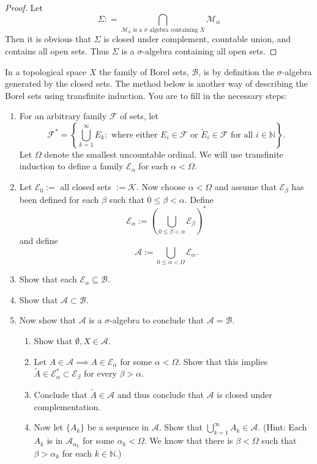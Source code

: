 \documentclass[../main.tex]{subfiles}
\begin{document}
\begin{proof}
    Let \[
     \Sigma : = \bigcap_{\mathcal{M}_{\alpha } \text{ is a } \sigma \text{ algebra containing }X }\mathcal{M}_{\alpha } 
    \] Then it is obvious that \(   \Sigma   \) is closed under complement,  countable union, and contains all open sets. Thus \(   \Sigma   \) is a \(   \sigma   \)-algebra containing all open sets.   
\end{proof}

\begin{exercise}{}{}
     In a topological space $X$ the family of Borel sets, $\mathcal{B}$, is by definition the $\sigma$-algebra generated by the closed sets. The method below is another way of describing the Borel sets using transfinite induction. You are to fill in the necessary steps:
    \begin{enumerate}
        \item For an arbitrary family $\mathcal{F}$ of sets, let
        \[
            \mathcal{F}^* = \left\{ \bigcup_{k=1}^{\infty} E_k : \text{ where either } E_i \in \mathcal{F} \text{ or } \tilde{E}_i \in \mathcal{F} \text{ for all } i \in \mathbb{N} \right\}.
        \]
        Let $\Omega$ denote the smallest uncountable ordinal. We will use transfinite induction to define a family $\mathcal{E}_\alpha$ for each $\alpha < \Omega$.
        \item Let $\mathcal{E}_0 :=$ all closed sets $:= \mathcal{K}$. Now choose $\alpha < \Omega$ and assume that $\mathcal{E}_\beta$ has been defined for each $\beta$ such that $0 \le \beta < \alpha$. Define
        \[
            \mathcal{E}_\alpha := \left( \bigcup_{0 \le \beta < \alpha} \mathcal{E}_\beta \right)^*
        \]
        and define
        \[
            \mathcal{A} := \bigcup_{0 \le \alpha < \Omega} \mathcal{E}_\alpha.
        \]
        \item Show that each $\mathcal{E}_\alpha \subseteq \mathcal{B}$.
        \item Show that $\mathcal{A} \subset \mathcal{B}$.
        \item Now show that $\mathcal{A}$ is a $\sigma$-algebra to conclude that $\mathcal{A} = \mathcal{B}$.
        \begin{enumerate}
            \item Show that $\emptyset, X \in \mathcal{A}$.
            \item Let $A \in \mathcal{A} \implies A \in \mathcal{E}_\alpha$ for some $\alpha < \Omega$. Show that this implies $\tilde{A} \in \mathcal{E}_\alpha^* \subset \mathcal{E}_\beta$ for every $\beta > \alpha$.
            \item Conclude that $\tilde{A} \in \mathcal{A}$ and thus conclude that $\mathcal{A}$ is closed under complementation.
            \item Now let $\{A_k\}$ be a sequence in $\mathcal{A}$. Show that $\bigcup_{k=1}^{\infty} A_k \in \mathcal{A}$.
            (Hint: Each $A_k$ is in $\mathcal{A}_{\alpha_k}$ for some $\alpha_k < \Omega$. We know that there is $\beta < \Omega$ such that $\beta > \alpha_k$ for each $k \in \mathbb{N}$.)
        \end{enumerate}
    \end{enumerate}
\end{exercise}
\end{document}
